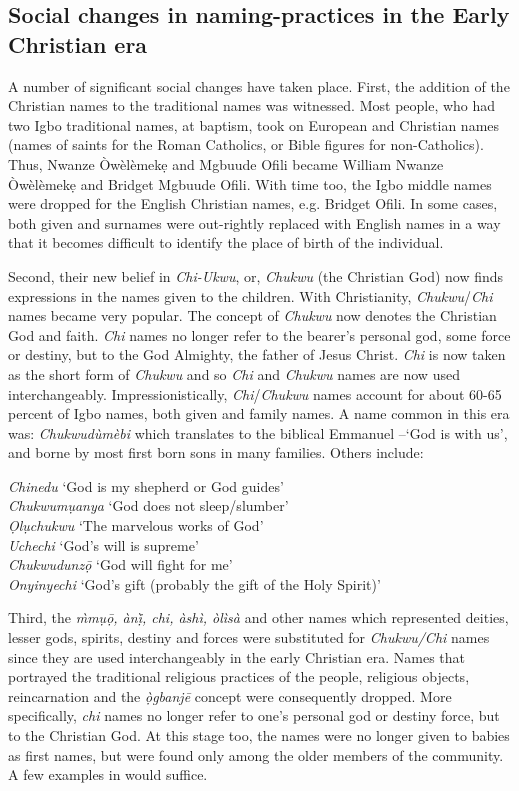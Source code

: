 \documentclass[output=paper]{langscibook}
\begin{document}
\subsection{Social changes in naming-practices in the Early Christian era}
A number of significant social changes have taken place. First, the addition of the Christian names to the traditional names was witnessed. Most people, who had two Igbo traditional names, at baptism, took on European and Christian names (names of saints for the Roman Catholics, or Bible figures for non-Catholics). Thus, Nwanze Òwèlèmekẹ and Mgbuude Ofili became William Nwanze Òwèlè\-mekẹ and Bridget Mgbuude Ofili. With time too, the Igbo middle names were dropped for the English Christian names, e.g. Bridget Ofili. In some cases, both given and surnames were out-rightly replaced with English names in a way that it becomes difficult to identify the place of birth of the individual. 

Second, their new belief in \textit{Chi-Ukwu}, or, \textit{Chukwu} (the Christian God) now finds expressions in the names given to the children. With Christianity, \textit{Chukwu}\slash\textit{Chi} names became very popular. The concept of \textit{Chukwu} now denotes the Christian God and faith. \textit{Chi} names no longer refer to the bearer’s personal god, some force or destiny, but to the God Almighty, the father of Jesus Christ. \textit{Chi} is now taken as the short form of \textit{Chukwu} and so \textit{Chi} and \textit{Chukwu} names are now used interchangeably. Impressionistically, \textit{Chi}/\textit{Chukwu} names account for about 60-65 percent of Igbo names, both given and family names. A name common in this era was: \textit{Chukwudùmèbi} which translates to the biblical Emmanuel --‘God is with us’, and borne by most first born sons in many families. Others include:

\ea
\textit{Chinedu} ‘God is my shepherd or God guides’ \\
\textit{Chukwumụanya} ‘God does not sleep/slumber’\\
\textit{Ọlụchukwu} ‘The marvelous works of God’ \\
\textit{Uchechi} ‘God’s will is supreme’\\
\textit{Chukwudunzọ̄ } ‘God will fight for me’\\
\textit{Onyinyechi} ‘God’s gift (probably the gift of the Holy Spirit)’
\z

Third, the \textit{m̀mụọ̄, ànị̀, chi, àshì, òlìsà} and other names which represented deities, lesser gods, spirits, destiny and forces were substituted for \textit{Chukwu/Chi} names since they are used interchangeably in the early Christian era. Names that portrayed the traditional religious practices of the people, religious objects, reincarnation and the \textit{ọ̀gbanjē} concept were consequently dropped. More specifically, \textit{chi} names no longer refer to one’s personal god or destiny force, but to the Christian God. At this stage too, the names were no longer given to babies as first names, but were found only among the older members of the community. A few examples in  would suffice.
\end{document}
